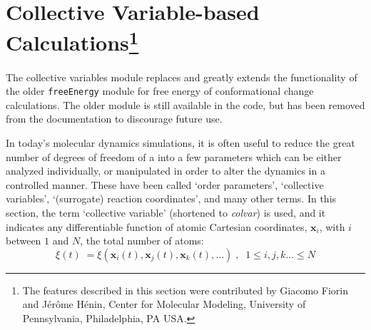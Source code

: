 
\section{Collective Variable-based Calculations\footnote{ The features described in this section were contributed by Giacomo Fiorin and J\'er\^ome H\'enin, Center for Molecular Modeling, University of Pennsylvania, Philadelphia, PA USA.}}
\label{section:colvars}

The collective variables module replaces and greatly extends the
functionality of the older \texttt{freeEnergy} module for free energy
of conformational change calculations.  The older module is still
available in the code, but has been removed from the documentation to
discourage future use.

In today's molecular dynamics simulations, it is often useful to
reduce the great number of degrees of freedom of a into a few
parameters which can be either analyzed individually, or manipulated
in order to alter the dynamics in a controlled manner.  These have
been called `order parameters', `collective variables', `(surrogate)
reaction coordinates', and many other terms.  In this section, the
term `collective variable' (shortened to \textit{colvar}) is used, and
it indicates any differentiable function of atomic Cartesian
coordinates, $\bm{x}_{i}$, with $i$ between $1$ and $N$, the total
number of atoms:
\begin{equation} 
  \label{eq:colvar_basic}
  \xi(t) \; = \xi\left(\bm{x}_{i}(t), \bm{x}_{j}(t), \bm{x}_{k}(t),
  \ldots \right)\;, \;\; 1 \leq i,j,k\ldots \leq N
\end{equation}

